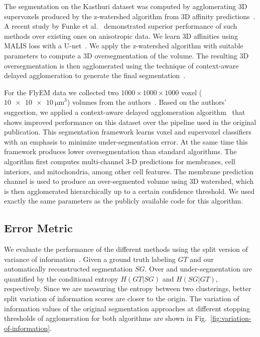 The segmentation on the Kasthuri dataset was computed by agglomerating 3D supervoxels produced by the z-watershed algorithm from 3D affinity predictions~\cite{zlateski2015image}. A recent study by Funke et al.~\cite{schlegel2017learning} demonstrated superior performance of such methods over existing ones on anisotropic data. We learn 3D affinities using MALIS loss with a U-net~\cite{Turaga:2009,ronneberger2015u}. We apply the z-watershed algorithm with suitable parameters to compute a 3D oversegmentation of the volume. The resulting 3D oversegmentation is then agglomerated using the technique of context-aware delayed agglomeration to generate the final segmentation~\cite{10.1371/journal.pone.0125825}.

For the FlyEM data we collected two $1000 \times 1000 \times 1000$ voxel ($\SI[product-units=single]{10x10x10}{\micro\meter}^3$) volumes from the authors~\cite{takemura2017connectome}. Based on the authors' suggestion, we applied a context-aware delayed agglomeration algorithm~\cite{10.1371/journal.pone.0125825} that shows improved performance on this dataset over the pipeline used in the original publication. This segmentation framework learns voxel and supervoxel classifiers with an emphasis to minimize under-segmentation error. At the same time this framework produces lower oversegmentation than standard algorithms. The algorithm first computes multi-channel 3-D predictions for membranes, cell interiors, and mitochondria, among other cell features. The membrane prediction channel is used to produce an over-segmented volume using 3D watershed, which is then agglomerated hierarchically up to a certain confidence threshold. We used exactly the same parameters as the publicly available code for this algorithm.

\subsection{Error Metric}
\label{sec:variation-of-information}

We evaluate the performance of the different methods using the split version of variance of information~\cite{meila2003comparing}. Given a ground truth labeling $GT$ and our automatically reconstructed segmentation $SG$.
Over and under-segmentation are quantified by the conditional entropy $H(GT | SG)$ and $H(SG | GT)$, respectively. Since we are measuring the entropy between two clusterings, better split variation of information scores are closer to the origin. The variation of information values of the original segmentation approaches at different stopping thresholds of agglomeration for both algorithms are shown in Fig.~\ref{fig:variation-of-information}. 

